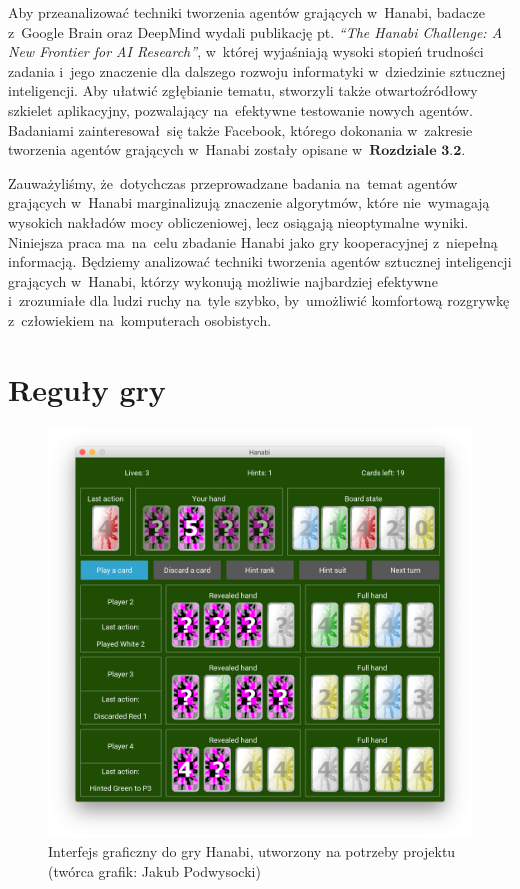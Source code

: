 \documentclass[declaration,shortabstract,inz]{iithesis}
\begin{document}
Aby przeanalizować techniki tworzenia agentów grających w~Hanabi, badacze z~Google Brain oraz DeepMind wydali publikację pt. \textit{``The Hanabi Challenge: A New Frontier for AI Research''}\cite{OurInspiration}, w~której wyjaśniają wysoki stopień trudności zadania i~jego znaczenie dla dalszego rozwoju informatyki w~dziedzinie sztucznej inteligencji. Aby ułatwić zgłębianie tematu, stworzyli także otwartoźródłowy szkielet aplikacyjny, pozwalający na~efektywne testowanie nowych agentów. Badaniami zainteresował~się także Facebook, którego dokonania w~zakresie tworzenia agentów grających w~Hanabi zostały opisane w~$\hyperref[sec:fb]{\textbf{Rozdziale~3.2}}$.

Zauważyliśmy, że~dotychczas przeprowadzane badania na~temat agentów grających w~Hanabi marginalizują znaczenie algorytmów, które nie~wymagają wysokich nakładów mocy obliczeniowej, lecz osiągają nieoptymalne wyniki. Niniejsza praca ma~na~celu zbadanie Hanabi jako gry kooperacyjnej z~niepełną informacją. Będziemy analizować techniki tworzenia agentów sztucznej inteligencji grających w~Hanabi, którzy wykonują możliwie najbardziej efektywne i~zrozumiałe dla ludzi ruchy na~tyle szybko, by~umożliwić komfortową rozgrywkę z~człowiekiem na~komputerach osobistych.


\chapter{Reguły gry}
\label{sec:rules}

\begin{figure}[ht!]
	\centering
	\captionsetup{format=hang}
	\includegraphics[width=\textwidth,height=\textheight,keepaspectratio]{gui.png}
	\caption[Caption]{Interfejs graficzny do gry Hanabi, utworzony na potrzeby projektu (twórca grafik: Jakub Podwysocki)}
	\label{fig:gui}
\end{figure}
\end{document}
